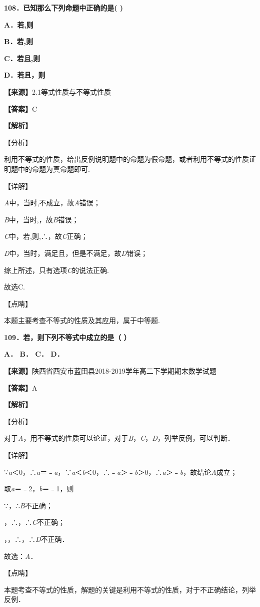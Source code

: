 \textbf{108．已知那么下列命题中正确的是( )}

\textbf{A．若,则}

\textbf{B．若,则}

\textbf{C．若且,则}

\textbf{D．若且，则}

\textbf{【来源】}2.1等式性质与不等式性质

\textbf{【答案】}C

\textbf{【解析】}

【分析】

利用不等式的性质，给出反例说明题中的命题为假命题，或者利用不等式的性质证明题中的命题为真命题即可.

【详解】

\emph{A}中，当时,不成立，故\emph{A}错误；

\emph{B}中，当时,，故\emph{B}错误；

\emph{C}中，若,则,∴，故\emph{C}正确；

\emph{D}中，当时，满足且，但是不满足，故\emph{D}错误；

综上所述，只有选项\emph{C}的说法正确.

故选C.

【点睛】

本题主要考查不等式的性质及其应用，属于中等题.

\textbf{109．若，则下列不等式中成立的是（ ）}

\textbf{A． B． C． D．}

\textbf{【来源】}陕西省西安市蓝田县2018-2019学年高二下学期期末数学试题

\textbf{【答案】}A

\textbf{【解析】}

【分析】

对于\emph{A}，用不等式的性质可以论证，对于\emph{B}，\emph{C}，\emph{D}，列举反例，可以判断．

【详解】

∵\emph{a}＜0，∴\textbar{}\emph{a}\textbar＝﹣\emph{a}，∵\emph{a}＜\emph{b}＜0，∴﹣\emph{a}＞﹣\emph{b}＞0，∴\textbar{}\emph{a}\textbar＞﹣\emph{b}，故结论\emph{A}成立；

取\emph{a}＝﹣2，\emph{b}＝﹣1，则

∵，∴\emph{B}不正确；

，∴，∴\emph{C}不正确；

，，∴，∴\emph{D}不正确．

故选：\emph{A}．

【点睛】

本题考查不等式的性质，解题的关键是利用不等式的性质，对于不正确结论，列举反例．

